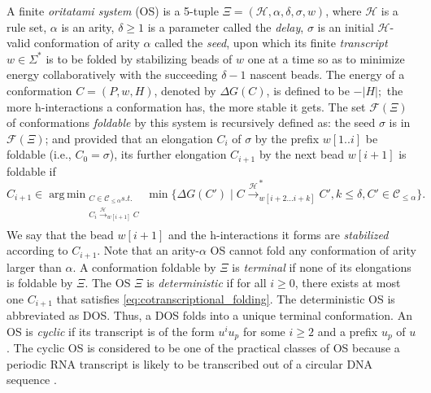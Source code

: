 \documentclass[runningheads]{llncs}
\DeclareMathOperator*{\argmin}{arg\,min}
\begin{document}
A finite \textit{oritatami system} (OS) is a 5-tuple $\Xi = (\mathcal{H}, \alpha, \delta, \sigma,w)$, where 
$\mathcal{H}$ is a rule set,
$\alpha$ is an arity, 
$\delta \geq 1$ is a parameter called the \textit{delay}, 
$\sigma$ is an initial $\mathcal{H}$-valid conformation of arity $\alpha$ called the \textit{seed}, upon which its finite \textit{transcript} $w \in \Sigma^*$ is to be folded by stabilizing beads of $w$ one at a time so as to minimize energy collaboratively with the succeeding $\delta -1$ nascent beads. 
The energy of a conformation $C = (P, w, H)$, denoted by $\Delta G(C)$, is defined to be $-|H|;$ the more h-interactions a conformation has, the more stable it gets.
The set $\mathcal{F}(\Xi)$ of conformations \textit{foldable} by this system is recursively defined as: 
the seed $\sigma$ is in $\mathcal{F}(\Xi)$; and provided that an elongation $C_{i}$ of $\sigma$ by the prefix $w[1..i]$ be foldable (i.e., $C_0 = \sigma$), its further elongation $C_{i+1}$ by the next bead $w[i+1]$ is foldable if
\begin{equation}\label{eq:cotranscriptional_folding}
C_{i+1} \in \argmin_{
\substack{
C \in \mathcal{C}_{\le \alpha} s.t. \\
C_i \xrightarrow{\mathcal{H}}_{w[i+1]}C \\
}
}
\min \Big\{ \Delta G(C') \mid 
C \xrightarrow{\mathcal{H}}^*_{w[i+2...i+k]}C', k\le \delta, C' \in \mathcal{C}_{\le \alpha}
\Big\}.
\end{equation}
We say that the bead $w[i+1]$ and the h-interactions it forms are \textit{stabilized} according to $C_{i+1}$.
Note that an arity-$\alpha$ OS cannot fold any conformation of arity larger than $\alpha$.
A conformation foldable by $\Xi$ is \textit{terminal} if none of its elongations is foldable by $\Xi$. 
The OS $\Xi$ is \textit{deterministic} if for all $i \ge 0$, there exists at most one $C_{i+1}$ that satisfies \eqref{eq:cotranscriptional_folding}. 
The deterministic OS is abbreviated as DOS. 
Thus, a DOS folds into a unique terminal conformation. 
An OS is \textit{cyclic} if its transcript is of the form $u^i u_p$ for some $i \ge 2$ and a prefix $u_p$ of $u$. 
The cyclic OS is considered to be one of the practical classes of OS because a periodic RNA transcript is likely to be transcribed out of a circular DNA sequence \cite{GearyAndersen2014}. 
\end{document}
